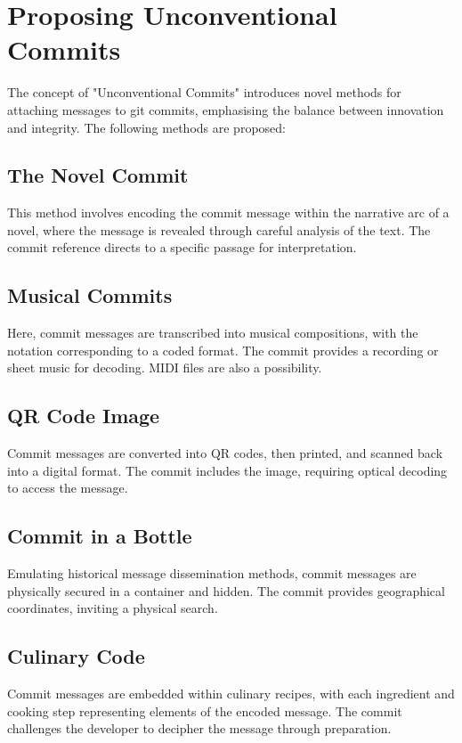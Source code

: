 \documentclass[12pt]{article}
\begin{document}
\section{Proposing Unconventional Commits}
    The concept of "Unconventional Commits" introduces novel methods for attaching messages to git commits, emphasising the balance between innovation and integrity. The following methods are proposed:

    \subsection{The Novel Commit}
        This method involves encoding the commit message within the narrative arc of a novel, where the message is revealed through careful analysis of the text. The commit reference directs to a specific passage for interpretation.

    \subsection{Musical Commits}
        Here, commit messages are transcribed into musical compositions, with the notation corresponding to a coded format. The commit provides a recording or sheet music for decoding. MIDI files are also a possibility.

    \subsection{QR Code Image}
        Commit messages are converted into QR codes, then printed, and scanned back into a digital format. The commit includes the image, requiring optical decoding to access the message.

    \subsection{Commit in a Bottle}
        Emulating historical message dissemination methods, commit messages are physically secured in a container and hidden. The commit provides geographical coordinates, inviting a physical search.

    \subsection{Culinary Code}
        Commit messages are embedded within culinary recipes, with each ingredient and cooking step representing elements of the encoded message. The commit challenges the developer to decipher the message through preparation.
\end{document}
